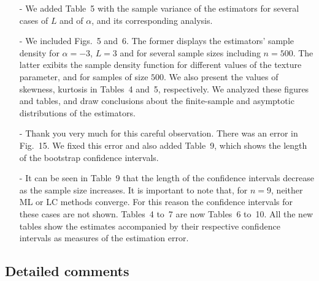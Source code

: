 \documentclass{ar2rc}
\begin{document}
	\begin{itemize}
		\item [-] We added Table~5 with the sample variance of the estimators for several cases of $L$ and of $\alpha$, and its corresponding analysis.
		
		\item [-] We included Figs.~5 and~6. 
			The former displays the estimators' sample density for $\alpha=-3$, $L=3$ and for several sample sizes including $n=500$. 
			The latter exibits the sample density function for different values of the texture parameter, and for samples of size $500$. 
			We also present the values of skewness, kurtosis in Tables~4 and~5, respectively. We analyzed these figures and tables, and draw conclusions about the finite-sample and asymptotic distributions of the estimators.
		
		\item [-] Thank you very much for this careful observation. There was an error in Fig.~15. We fixed this error and also added Table~9, which shows the length of the bootstrap confidence intervals.
		
		\item [-] It can be seen in Table~9 that the length of the confidence intervals decrease as the sample size increases. It is important to note that, for $n=9$, neither ML or LC methods converge. 
		For this reason the confidence intervals for these cases are not shown. Tables~4 to~7 are now Tables~6 to~10. 
		All the new tables show the estimates accompanied by their respective confidence intervals as measures of the estimation error. 
	\end{itemize}
	
	
	
	
	\subsection{Detailed comments}
	
	
\end{document}
